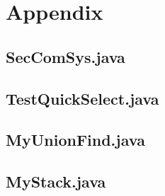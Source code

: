 \documentclass[a5paper]{article}
\begin{document}
\section{Appendix}
\subsection{SecComSys.java}\label{sec:akka}

\subsection{TestQuickSelect.java}

\subsection{MyUnionFind.java}

\subsection{MyStack.java}

\end{document}
